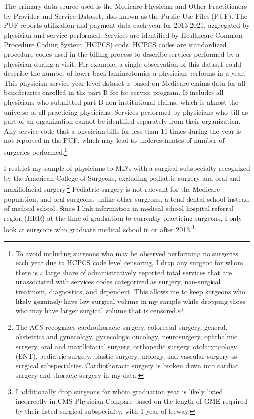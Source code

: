 
The primary data source used is the Medicare Physician and Other Practitioners by Provider and Service Dataset, also known as the Public Use Files (PUF). The PUF reports utilization and payment data each year for 2013-2021, aggregated by physician and service performed. Services are identified by Healthcare Common Procedure Coding System (HCPCS) code. HCPCS codes are standardized procedure codes used in the billing process to describe services performed by a physician during a visit. For example, a single observation of this dataset could describe the number of lower back laminectomies a physician performs in a year. This physician-service-year level dataset is based on Medicare claims data for all beneficiaries enrolled in the part B fee-for-service program. It includes all physicians who submitted part B non-institutional claims, which is almost the universe of all practicing physicians. Services performed by physicians who bill as part of an organization cannot be identified separately from their organization. Any service code that a physician bills for less than 11 times during the year is not reported in the PUF, which may lead to underestimates of number of surgeries performed.\footnote{To avoid including surgeons who may be observed performing no surgeries each year due to HCPCS code level censoring, I drop any surgeon for whom there is a large share of administratively reported total services that are unassociated with services codes categorized as surgery, non-surgical treatment, diagnostics, and dependent. This allows me to keep surgeons who likely genuinely have low surgical volume in my sample while dropping those who may have larger surgical volume that is censored.}

I restrict my sample of physicians to MD's with a surgical subspecialty recognized by the American College of Surgeons, excluding pediatric surgery and oral and maxillofacial surgery.\footnote{The ACS recognizes cardiothoracic surgery, colorectal surgery, general, obstetrics and gynecology, gynecologic oncology, neurosurgery, ophthalmic surgery, oral and maxillofacial surgery, orthopedic surgery, otolaryngology (ENT), pediatric surgery, plastic surgery, urology, and vascular surgery as surgical subspecialties. Cardiothoracic surgery is broken down into cardiac surgery and thoracic surgery in my data.} Pediatric surgery is not relevant for the Medicare population, and oral surgeons, unlike other surgeons, attend dental school instead of medical school. Since I link information in medical school hospital referral region (HRR) at the time of graduation to currently practicing surgeons, I only look at surgeons who graduate medical school in or after 2013.\footnote{I additionally drop surgeons for whom graduation year is likely listed incorrectly in CMS Physician Compare based on the length of GME required by their listed surgical subspecialty, with 1 year of leeway.}

